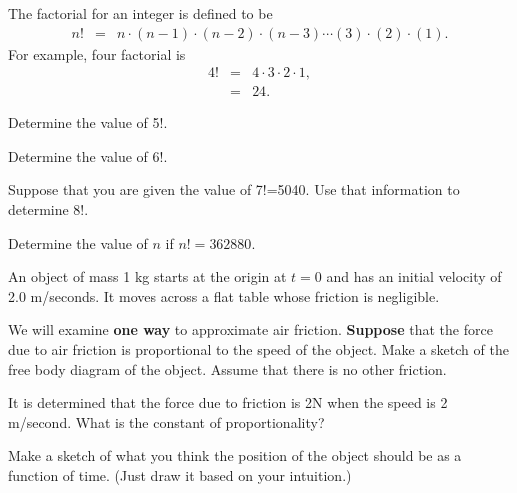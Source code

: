 \begin{problem}
\item The factorial for an integer is defined to be
  \begin{eqnarray*}
    n! & = & n \cdot (n-1) \cdot (n-2) \cdot (n-3) \cdots (3) \cdot (2) \cdot (1).
  \end{eqnarray*}
  For example, four factorial is
  \begin{eqnarray*}
    4! & = & 4 \cdot 3 \cdot 2 \cdot 1, \\
       & = & 24.
  \end{eqnarray*}

  \begin{subproblem}
  \item Determine the value of 5!.
    \vfill
  \item Determine the value of 6!.
    \vfill
  \item Suppose that you are given the value of 7!=5040. Use that
    information to determine 8!.
    \vfill
  \item Determine the value of $n$ if $n!=362880$.
    \vfill
  \end{subproblem}

\clearpage

\item An object of mass 1 kg starts at the origin at $t=0$ and has an
  initial velocity of 2.0 m/seconds. It moves across a flat table
  whose friction is negligible.
  \begin{subproblem}
  \item We will examine \textbf{one way} to approximate air friction.
    \textbf{Suppose} that the force due to air friction is
    proportional to the speed of the object.  Make a sketch of the
    free body diagram of the object. Assume that there is no other
    friction.  

    \vfill

  \item It is determined that the force due to friction is 2N when the
    speed is 2 m/second. What is the constant of proportionality?

    \vspace{4em}

  \item Make a sketch of what you think the position of the object
    should be as a function of time. (Just draw it based on
    your intuition.)

    \vfill
  \end{subproblem}

\end{problem}


